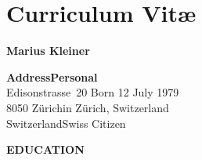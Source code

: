 \chapter*{Curriculum Vit\ae}

\vspace{\baselineskip}
\begin{center}
  \textsf{\textbf{\Large Marius Kleiner}}
\end{center}

\vspace{0.5\baselineskip}

\noindent
\textsf{\textbf{Address}}\hfill \textsf{\textbf{Personal}}\\
Edisonstrasse~20 \hfill Born 12 July 1979\\
8050 Z\"urich\hfill in Z\"urich, Switzerland\\
Switzerland\hfill Swiss Citizen

\vspace{\baselineskip}
\noindent\textsf{\textbf{EDUCATION}}

 \newenvironment{cvlist}[1]{%
 \begin{list}{}{%
   \renewcommand{\makelabel}[1]{\hspace\labelsep \normalfont ##1}%
   \settowidth\labelwidth{\makelabel{#1}}%
   \setlength{\leftmargin}{\labelwidth}%
 }}
 {\end{list}}
 
